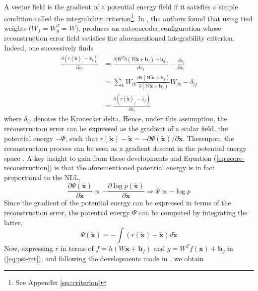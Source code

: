A vector field is the gradient of a potential energy field if it satisfies a simple condition called the integrability criterion\footnote{See Appendix \ref{sec:criterion}}. In \citep{potentialenergy}, the authors found that using tied weights ($W_f = W_g^T = W$), produces an autoencoder configuration whose reconstruction error field satisfies the aforementioned integrability criterion. Indeed, one successively finds
\begin{equation}
\begin{split}
\frac{\partial(r(\tilde{\mathbf{x}})_i- \tilde{x}_i)}{\partial  \tilde{x}_j} &= \frac{\partial\big[W^T h(W\tilde{\mathbf{x}} + \mathbf{b}_f) + \mathbf{b}_g\big]_i}{\partial  \tilde{x}_j} - \frac{\partial\tilde{x}_i}{\partial  \tilde{x}_j} \\
&= \sum_k W_{ik} \frac{\partial h(W\tilde{\mathbf{x}} + \mathbf{b}_f)}{\partial(W\tilde{\mathbf{x}} + \mathbf{b}_f)}W_{jk} - \delta_{ij}   \\
&= \frac{\partial(r(\tilde{\mathbf{x}})_j- \tilde{x}_j)}{\partial  \tilde{x}_i}
\end{split}
\end{equation} 
where $\delta_{ij}$ denotes the Kronecker delta. Hence, under this assumption, the reconstruction error can be expressed as the gradient of a scalar field, the potential energy $-\Psi$, such that $r(\tilde{\mathbf{x}}) - \tilde{\mathbf{x}} = -\partial \Psi(\tilde{\mathbf{x}})/\partial \tilde{\mathbf{x}}$. Thereupon, the reconstruction process can be seen as a gradient descent in the potential energy space \citep{potentialenergy}. A key insight to gain from these developments and Equation (\ref{eq:score-reconstruction}) is that the aforementioned potential energy is in fact proportional to the NLL,
\begin{equation}
\frac{\partial \Psi(\tilde{\mathbf{x}})}{\partial \tilde{\mathbf{x}}} \propto -\frac{\partial \log p(\tilde{\mathbf{x}})}{\partial \tilde{\mathbf{x}}} \Rightarrow  \Psi \propto -\log p
\end{equation}
Since the gradient of the potential energy can be expressed in terms of the reconstruction error, the potential energy $\Psi$ can be computed by integrating the latter,
\begin{equation}
 \Psi(\tilde{\mathbf{x}}) = -\int (r(\tilde{\mathbf{x}}) - \tilde{\mathbf{x}})d\tilde{\mathbf{x}} 
 \label{eq:psi-int}
\end{equation}
Now, expressing $r$ in terms of $f = h(W\mathbf{x} + \mathbf{b}_f)$ and $g = W^Tf(\mathbf{x}) + \mathbf{b}_g$ in (\ref{eq:psi-int}), and following the developments made in \citep{potentialenergy}, we obtain
